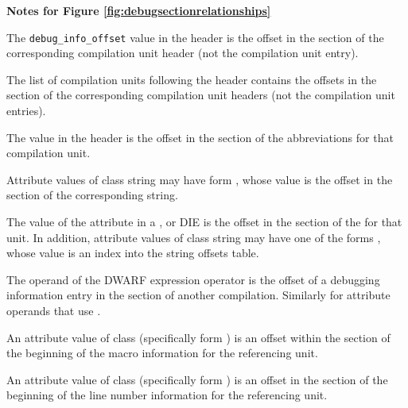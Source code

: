 \clearpage
\begin{center}
   \textbf{Notes for Figure \ref{fig:debugsectionrelationships}}
\end{center}
\begin{description} 
The \texttt{debug\_info\_offset} value in
the header is
the offset in the \dotdebuginfo{} section of the
corresponding compilation unit header (not the compilation
unit entry).

The list of compilation units following the header contains the offsets in the
\dotdebuginfo{} section of the 
corresponding compilation unit headers (not
the compilation unit entries). 

The \HFNdebugabbrevoffset{} value in the header is the offset in the
\dotdebugabbrev{} 
section of the abbreviations for that compilation unit.

Attribute values of class string may have form 
\DWFORMstrp, whose
value is the offset in the \dotdebugstr{}
section of the corresponding string.

The value of the \DWATstroffsetsbase{} attribute in a
\DWTAGcompileunit{}, \DWTAGtypeunit{} or \DWTAGpartialunit{} 
DIE is the offset in the
\dotdebugstroffsets{} section of the 
for that unit.
In addition, attribute values of class string may have 
one of the forms 
\DWFORMstrxXNor, whose value is an index into the
string offsets table.

The operand of the \DWOPcallref{} 
DWARF expression operator is the
offset of a debugging information entry in the 
\dotdebuginfo{} section of another compilation.
Similarly for attribute operands that use
\DWFORMrefaddr.

An attribute value of class 
 (specifically form
\DWFORMsecoffset) is an 
offset within the 
\dotdebugmacro{} section
of the beginning of the macro information for the referencing unit.

An attribute value of class 
 (specifically form
\DWFORMsecoffset) 
is an offset in the 
\dotdebugline{} section of the
beginning of the line number information for the referencing unit.


\end{description}
